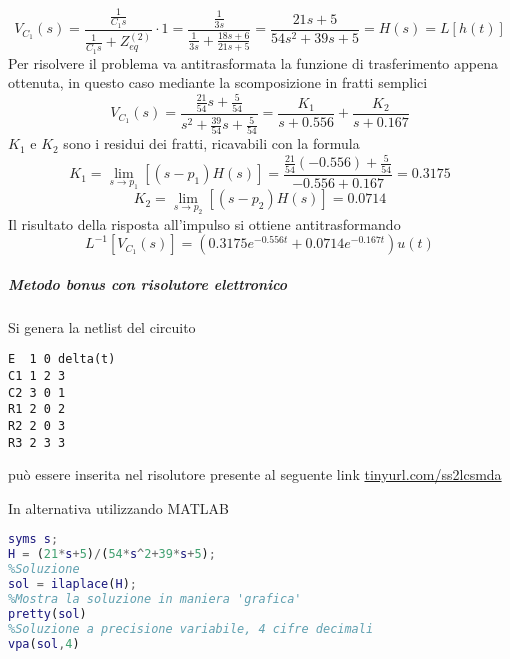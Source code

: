 $$
V_{C_1}(s) = \frac{\frac{1}{C_1s}}{\frac{1}{C_1s}+Z_{eq}^{(2)}}\cdot 1 =
\frac{\frac{1}{3s}}{\frac{1}{3s} + \frac{18s + 6}{21s + 5}} = \frac{21s + 5}{54s^2 + 39s + 5} = H(s) =
L[h(t)]
$$
Per risolvere il problema va antitrasformata la funzione di trasferimento appena ottenuta,
in questo caso mediante la scomposizione in fratti semplici
$$
V_{C_1}(s) = \frac{\frac{21}{54}s + \frac{5}{54}}{s^2 + \frac{39}{54}s + \frac{5}{54}}
= \frac{K_1}{s + 0.556} + \frac{K_2}{s+0.167}
$$
$K_1$ e $K_2$ sono i residui dei fratti, ricavabili con la formula
$$
K_1 = \lim_{s\to p_1} [(s-p_1)H(s)] = \frac{\frac{21}{54}(-0.556) + \frac{5}{54}}{-0.556 + 0.167} = 
0.3175
$$
$$
K_2 = \lim_{s\to p_2}[(s-p_2)H(s)] = 0.0714
$$
Il risultato della risposta all'impulso si ottiene antitrasformando
$$
L^{-1}[V_{C_1}(s)] = \left(0.3175 e ^{-0.556 t } + 0.0714 e^{-0.167 t}\right)u(t)
$$
\newpage
\subparagraph{Metodo bonus con risolutore elettronico}
Si genera la netlist del circuito
\begin{lstlisting}[frame = single]
E  1 0 delta(t)
C1 1 2 3
C2 3 0 1
R1 2 0 2
R2 2 0 3
R3 2 3 3
\end{lstlisting}
può essere inserita nel risolutore presente al seguente link \href{http://143.225.92.177:54323/}
{tinyurl.com/ss2lcsmda}

In alternativa utilizzando MATLAB
\begin{lstlisting}[style=Matlab-editor,language = Matlab]
syms s;
H = (21*s+5)/(54*s^2+39*s+5);
%Soluzione
sol = ilaplace(H);
%Mostra la soluzione in maniera 'grafica'
pretty(sol)
%Soluzione a precisione variabile, 4 cifre decimali
vpa(sol,4)
\end{lstlisting}
